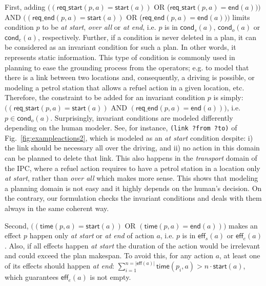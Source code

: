 \documentclass{ecai}
\newcommand{\eff}{\mathsf{eff}}    %
\newcommand{\cond}{\mathsf{cond}}  %
\newcommand{\start}{\mathsf{start}}%
\newcommand{\en}{\mathsf{end}}     %
\newcommand{\tim}{\mathsf{time}}   %
\newcommand{\reqs}{\mathsf{req\_{start}}} %
\newcommand{\reqe}{\mathsf{req\_{end}}}   %
\begin{document}
First, adding $((\reqs(p,a) = \start(a))$ OR ($\reqs(p,a) = \en(a)))$ AND $((\reqe(p,a) = \start(a))$ OR ($\reqe(p,a) = \en(a)))$ limits condition $p$ to be \emph{at start}, \emph{over all} or \emph{at end}, i.e. $p$ is in $\cond_s(a)$, $\cond_o(a)$ or $\cond_e(a)$, respectively.
Further, if a condition is never deleted in a plan, it can be considered as an invariant condition for such a plan. In other words, it represents static information. This type of condition is commonly used in planning to ease the grounding process from the operators; e.g. to model that there is a link between two locations and, consequently, a driving is possible, or modeling a petrol station that allows a refuel action in a given location, etc. Therefore, the constraint to be added for an invariant condition $p$ is simply: $((\reqs(p,a) = \start(a))$ AND $(\reqe(p,a) = \en(a)))$, i.e. $p \in \cond_o(a)$.
Surprisingly, invariant conditions are modeled differently depending on the human modeler. See, for instance, \texttt{(link ?from ?to)} of Fig.~\ref{fig:exampleactions2}, which is modeled as an \emph{at start} condition despite: i) the link should be necessary all over the driving, and ii) no action in this domain can be planned to delete that link.
This also happens in the \emph{transport} domain of the IPC, where a refuel action requires to have a petrol station in a location only \emph{at start}, rather than \emph{over all} which makes more sense. This shows that modeling a planning domain is not easy and it highly depends on the human's decision. On the contrary, our formulation checks the invariant conditions and deals with them always in the same coherent way.


Second, $((\tim(p,a) = \start(a))$ OR $(\tim(p,a) = \en(a)))$ makes an effect $p$ happen only \emph{at start} or \emph{at end} of action $a$, i.e. $p$ is in $\eff_s(a)$ or $\eff_e(a)$.
Also, if all effects happen \emph{at start} the duration of the action would be irrelevant and could exceed the plan makespan. To avoid this, for any action $a$, at least one of its effects should happen \emph{at end}: $\sum_{i=1}^{n =|\eff(a)|} \tim(p_i,a) > n \cdot \start(a)$, which guarantees $\eff_e(a)$ is not empty.

\end{document}
